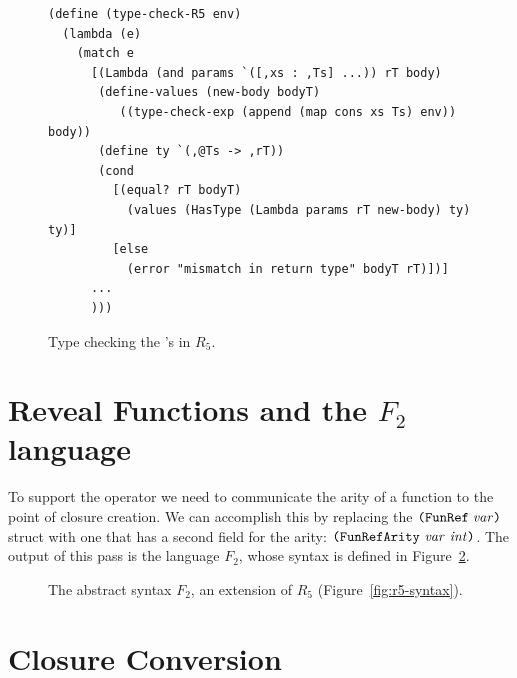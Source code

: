 \documentclass[11pt]{book}
\newcommand{\gray}[1]{{\color{gray} #1}}
\begin{document}
\begin{figure}[tbp]
\begin{lstlisting}
(define (type-check-R5 env)
  (lambda (e)
    (match e
      [(Lambda (and params `([,xs : ,Ts] ...)) rT body)
       (define-values (new-body bodyT) 
          ((type-check-exp (append (map cons xs Ts) env)) body))
       (define ty `(,@Ts -> ,rT))
       (cond
         [(equal? rT bodyT)
           (values (HasType (Lambda params rT new-body) ty) ty)]
         [else
           (error "mismatch in return type" bodyT rT)])]
      ...
      )))
\end{lstlisting}
\caption{Type checking the 's in $R_5$.}
\label{fig:type-check-R5}
\end{figure}


\section{Reveal Functions and the $F_2$ language}
\label{sec:reveal-functions-r5}


To support the  operator we need to communicate
the arity of a function to the point of closure creation.  We can
accomplish this by replacing the $\texttt{(FunRef}\;\mathit{var}\texttt{)}$ struct with one that
has a second field for the arity: $\texttt{(FunRefArity}~\mathit{var}~\mathit{int}\texttt{)}$.  The
output of this pass is the language $F_2$, whose syntax is defined in
Figure~\ref{fig:f2-syntax}.

\begin{figure}[tp]
\centering
\fbox{
\begin{minipage}{0.96\textwidth}
\[
\begin{array}{lcl}
\Exp &::=& \ldots \mid \FUNREFARITY{\Var}{\Int}\\
 \Def &::=& \gray{ \FUNDEF{\Var}{([\Var \code{:} \Type]\ldots)}{\Type}{\code{'()}}{\Exp} }\\
  F_2 &::=& \gray{\PROGRAMDEFS{\code{'()}}{\LP \Def\ldots \RP}}
\end{array}
\]
\end{minipage}
}
\caption{The abstract syntax $F_2$, an extension of $R_5$
  (Figure~\ref{fig:r5-syntax}).}
\label{fig:f2-syntax}
\end{figure}


\section{Closure Conversion}
\label{sec:closure-conversion}
\end{document}
